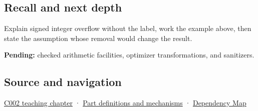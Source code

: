 \subsection{Recall and next depth}\label{appendix-1a599c924a4e-recall-and-next-depth}

Explain signed integer overflow without the label, work the example above, then state the assumption whose removal would change the result.

\textbf{Pending:} checked arithmetic facilities, optimizer transformations, and sanitizers.

\subsection{Source and navigation}\label{appendix-1a599c924a4e-source-and-navigation}

\hyperref[01-foundations-i-ch001-arithmetic-becomes-a-policy]{C002 teaching chapter} · \hyperref[appendix-fd090d982a15]{Part definitions and mechanisms} · \hyperref[appendix-4ad47bdd269a]{Dependency Map}
